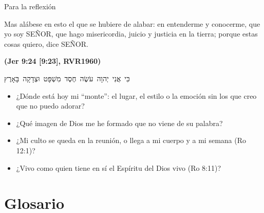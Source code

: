 \documentclass[hyperref={bookmarks=false},aspectratio=169]{beamer}
\newcommand{\heb}[1]{\mbox{\foreignlanguage{hebrew}{#1}}}
\newcommand{\SENOR}{S{\fontsize{0.78em}{1em}\selectfont EÑOR}}
\newcommand{\fuente}[1]{\par\hfill{\upshape\bfseries\footnotesize\textcolor{azul}{#1}}}
\begin{document}
\begin{frame}{Para la reflexión}
\begin{cita}Mas alábese en esto el que se hubiere de alabar: en entenderme y conocerme, que yo soy \SENOR, que hago misericordia, juicio y justicia en la tierra; porque estas cosas quiero, dice \SENOR.\fuente{(Jer 9:24 [9:23], RVR1960)}\end{cita}
\begin{center}\heb{כִּי אֲנִי יְהוָה עֹשֶׂה חֶסֶד מִשְׁפָּט וּצְדָקָה בָּאָרֶץ}\end{center}
\small
\begin{itemize}
\item ¿Dónde está hoy mi ``monte'': el lugar, el estilo o la emoción sin los que creo que no puedo adorar?
\item ¿Qué imagen de Dios me he formado que no viene de su palabra?
\item ¿Mi culto se queda en la reunión, o llega a mi cuerpo y a mi semana (Ro 12:1)?
\item ¿Vivo como quien tiene en sí el Espíritu del Dios vivo (Ro 8:11)?
\end{itemize}
\end{frame}

\section{Glosario}
\end{document}
